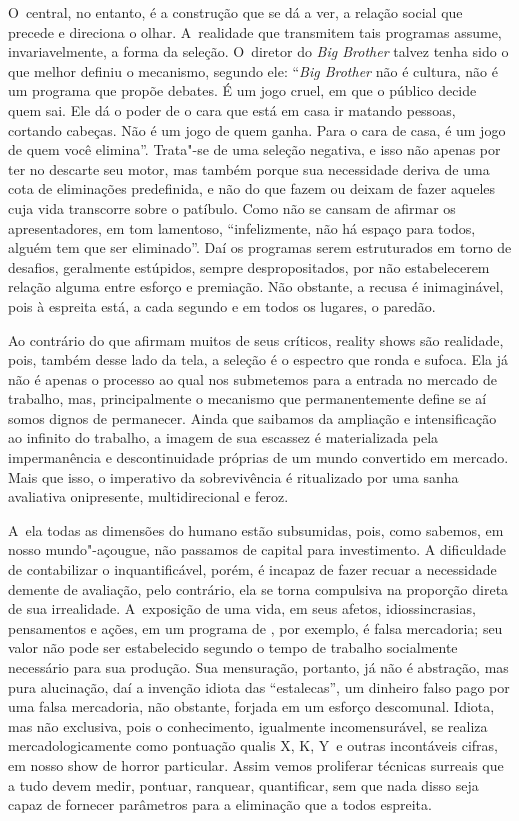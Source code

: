 O~central, no entanto, é a construção que se dá a ver, a relação social
que precede e direciona o olhar. A~realidade que transmitem tais
programas assume, invariavelmente, a forma da seleção. O~diretor do
\emph{Big Brother} talvez tenha sido o que melhor definiu o mecanismo,
segundo ele: ``\emph{Big Brother} não é cultura, não é um programa que
propõe debates. É um jogo cruel, em que o público decide quem sai. Ele
dá o poder de o cara que está em casa ir matando pessoas, cortando
cabeças. Não é um jogo de quem ganha. Para o cara de casa, é um jogo de
quem você elimina''. Trata"-se de uma seleção negativa, e isso não apenas
por ter no descarte seu motor, mas também porque sua necessidade deriva
de uma cota de eliminações predefinida, e não do que fazem ou deixam de
fazer aqueles cuja vida transcorre sobre o patíbulo. Como não se cansam
de afirmar os apresentadores, em tom lamentoso, ``infelizmente, não há
espaço para todos, alguém tem que ser eliminado''. Daí os programas
serem estruturados em torno de desafios, geralmente estúpidos, sempre
despropositados, por não estabelecerem relação alguma entre esforço e
premiação. Não obstante, a recusa é inimaginável, pois à espreita está,
a cada segundo e em todos os lugares, o paredão.

Ao contrário do que afirmam muitos de seus críticos, reality shows são
realidade, pois, também desse lado da tela, a seleção é o espectro que
ronda e sufoca. Ela já não é apenas o processo ao qual nos submetemos
para a entrada no mercado de trabalho, mas, principalmente o mecanismo
que permanentemente define se aí somos dignos de permanecer. Ainda que
saibamos da ampliação e intensificação ao infinito do trabalho, a imagem
de sua escassez é materializada pela impermanência e descontinuidade
próprias de um mundo convertido em mercado. Mais que isso, o imperativo
da sobrevivência é ritualizado por uma sanha avaliativa onipresente,
multidirecional e feroz.

A~ela todas as dimensões do humano estão subsumidas, pois, como sabemos,
em nosso mundo"-açougue, não passamos de capital para investimento. A
dificuldade de contabilizar o inquantificável, porém, é incapaz de fazer
recuar a necessidade demente de avaliação, pelo contrário, ela se torna
compulsiva na proporção direta de sua irrealidade. A~exposição de uma
vida, em seus afetos, idiossincrasias, pensamentos e ações, em um
programa de , por exemplo, é falsa mercadoria; seu valor não pode ser
estabelecido segundo o tempo de trabalho socialmente necessário para sua
produção. Sua mensuração, portanto, já não é abstração, mas pura
alucinação, daí a invenção idiota das ``estalecas'', um dinheiro falso
pago por uma falsa mercadoria, não obstante, forjada em um esforço
descomunal. Idiota, mas não exclusiva, pois o conhecimento, igualmente
incomensurável, se realiza mercadologicamente como pontuação qualis X,
K, Y~e outras incontáveis cifras, em nosso show de horror particular.
Assim vemos proliferar técnicas surreais que a tudo devem medir,
pontuar, ranquear, quantificar, sem que nada disso seja capaz de
fornecer parâmetros para a eliminação que a todos espreita.

